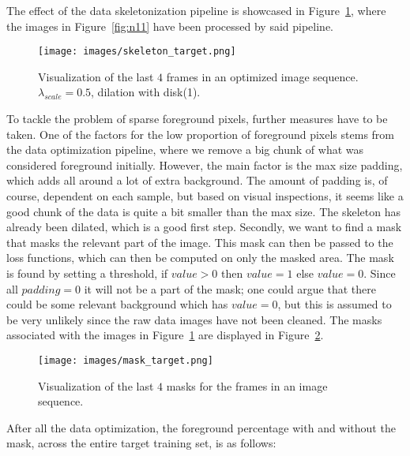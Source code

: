 \documentclass[a4paper,12pt]{article}
\begin{document}
The effect of the data skeletonization pipeline is showcased in Figure~\ref{fig:n12}, where the images in Figure~\ref{fig:n11} have been processed by said pipeline.
\begin{figure}[H]
\centering
\texttt{[image: images/skeleton\_target.png]}
\caption{Visualization of the last $4$ frames in an optimized image sequence. $\lambda_{scale}=0.5$, dilation with disk(1).} %
\label{fig:n12}
\end{figure}




To tackle the problem of sparse foreground pixels, further measures have to be taken. One of the factors for the low proportion of foreground pixels stems from the data optimization pipeline, where we remove a big chunk of what was considered foreground initially. However, the main factor is the max size padding, which adds all around a lot of extra background. The amount of padding is, of course, dependent on each sample, but based on visual inspections, it seems like a good chunk of the data is quite a bit smaller than the max size. The skeleton has already been dilated, which is a good first step. Secondly, we want to find a mask that masks the relevant part of the image. This mask can then be passed to the loss functions, which can then be computed on only the masked area.
The mask is found by setting a threshold, if $value>0$ then $value = 1$ else $value = 0$. Since all $padding = 0$ it will not be a part of the mask; one could argue that there could be some relevant background which has $value = 0$, but this is assumed to be very unlikely since the raw data images have not been cleaned.
The masks associated with the images in Figure~\ref{fig:n12} are displayed in Figure~\ref{fig:n13}.
\begin{figure}[H]
\centering
\texttt{[image: images/mask\_target.png]}
\caption{Visualization of the last $4$ masks for the frames in an image sequence.} %
\label{fig:n13}
\end{figure}




After all the data optimization, the foreground percentage with and without the mask, across the entire target training set, is as follows:
\end{document}
